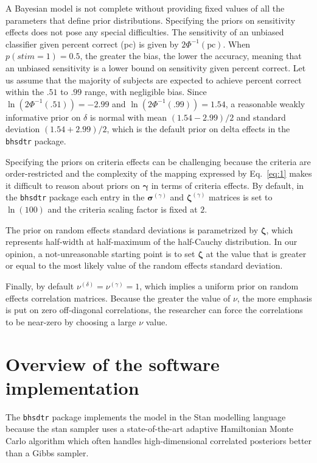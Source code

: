 \documentclass[a4paper,man,apacite,floatsintext]{apa6}
\newcommand{\code}[1]{\texttt{#1}}
\begin{document}

A Bayesian model is not complete without providing fixed values of all
the parameters that define prior distributions. Specifying the priors
on sensitivity effects does not pose any special difficulties. The
sensitivity of an unbiased classifier given percent correct (pc) is
given by $2 \Phi^{-1}(\text{pc})$. When $p(stim = 1) = 0.5$, the
greater the bias, the lower the accuracy, meaning that an unbiased
sensitivity is a lower bound on sensitivity given percent correct. Let
us assume that the majority of subjects are expected to achieve
percent correct within the $.51$ to $.99$ range, with negligible
bias. Since $\ln(2\Phi^{-1}(.51)) = -2.99$ and
$\ln(2 \Phi^{-1}(.99)) = 1.54$, a reasonable weakly informative prior
on $\delta$ is normal with mean $(1.54 - 2.99) / 2$ and standard
deviation $(1.54 + 2.99) / 2$, which is the default prior on delta
effects in the \code{bhsdtr} package.

Specifying the priors on criteria effects can be challenging because
the criteria are order-restricted and the complexity of the mapping
expressed by Eq.~\ref{eq:1} makes it difficult to reason about priors
on $\bm{\gamma}$ in terms of criteria effects. By default, in the
\code{bhsdtr} package each entry in the $\bm{\sigma}^{(\gamma)}$ and
$\bm{\zeta}^{(\gamma)}$ matrices is set to $\ln(100)$ and the criteria
scaling factor is fixed at $2$.

The prior on random effects standard deviations is parametrized by
$\bm{\zeta}$, which represents half-width at half-maximum of the
half-Cauchy distribution. In our opinion, a not-unreasonable starting
point is to set $\bm{\zeta}$ at the value that is greater or equal to
the most likely value of the random effects standard deviation.

Finally, by default $\nu^{(\delta)} = \nu^{(\gamma)} = 1$, which
implies a uniform prior on random effects correlation
matrices. Because the greater the value of $\nu$, the more emphasis is
put on zero off-diagonal correlations, the researcher can force the
correlations to be near-zero by choosing a large $\nu$ value.

\section{Overview of the software implementation}

The \code{bhsdtr} package implements the model in the Stan modelling
language because the stan sampler uses a state-of-the-art adaptive
Hamiltonian Monte Carlo algorithm which often handles high-dimensional
correlated posteriors better than a Gibbs sampler.
\end{document}
